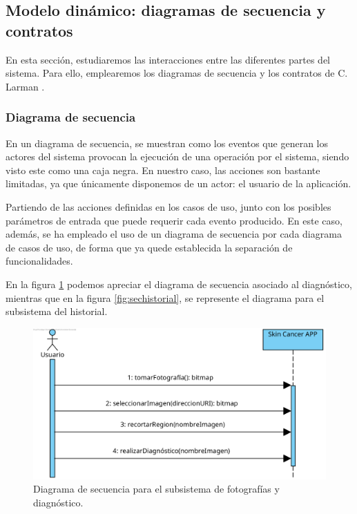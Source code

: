 \subsection{Modelo dinámico: diagramas de secuencia y contratos}

En esta sección, estudiaremos las interacciones entre las diferentes partes del sistema. Para ello, emplearemos los diagramas de secuencia y los contratos de C. Larman \cite{larman2003uml}.

\subsubsection{Diagrama de secuencia}
En un diagrama de secuencia, se muestran como los eventos que generan los actores del sistema provocan la ejecución de una operación por el sistema, siendo visto este como una caja negra. En nuestro caso, las acciones son bastante limitadas, ya que únicamente disponemos de un actor: el usuario de la aplicación. 

Partiendo de las acciones definidas en los casos de uso, junto con los posibles parámetros de entrada que puede requerir cada evento producido. En este caso, además, se ha empleado el uso de un diagrama de secuencia por cada diagrama de casos de uso, de forma que ya quede establecida la separación de funcionalidades.

En la figura \ref{fig:secdiag} podemos apreciar el diagrama de secuencia asociado al diagnóstico, mientras que en la figura \ref{fig:sechistorial}, se represente el diagrama para el subsistema del historial.

\begin{figure}[H]
	\centering
	\includegraphics[scale = 1]{imagenes/DiagramaSecuenciaFotografia.png}
	\caption{Diagrama de secuencia para el subsistema de fotografías y diagnóstico.}
	\label{fig:secdiag}
\end{figure}

